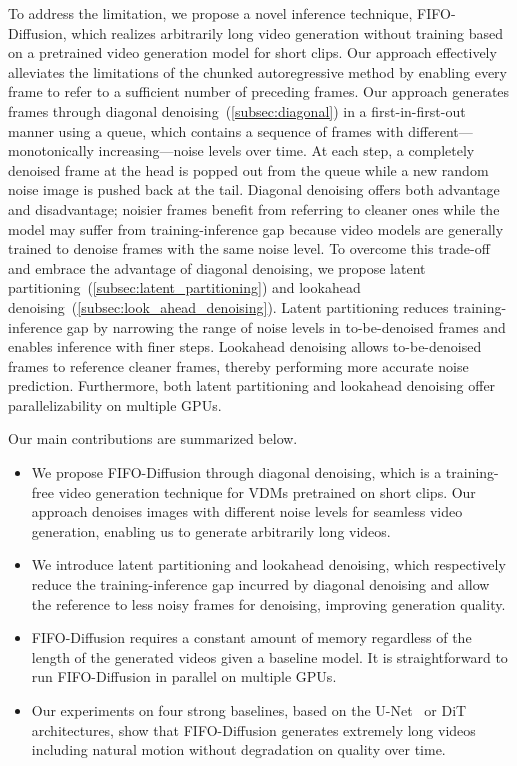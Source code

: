 To address the limitation, we propose a novel inference technique, FIFO-Diffusion, which realizes arbitrarily long video generation without training based on a pretrained video generation model for short clips.
Our approach effectively alleviates the limitations of the chunked autoregressive method by enabling every frame to refer to a sufficient number of preceding frames. 
Our approach generates frames through diagonal denoising~(\cref{subsec:diagonal}) in a first-in-first-out manner using a queue, which contains a sequence of frames with different---monotonically increasing---noise levels over time.
At each step, a completely denoised frame at the head is popped out from the queue while a new random noise image is pushed back at the tail.
Diagonal denoising offers both advantage and disadvantage; noisier frames benefit from referring to cleaner ones while the model may suffer from training-inference gap because video models are generally trained to denoise frames with the same noise level.
To overcome this trade-off and embrace the advantage of diagonal denoising, we propose latent partitioning~(\cref{subsec:latent_partitioning}) and lookahead denoising~(\cref{subsec:look_ahead_denoising}). 
Latent partitioning reduces training-inference gap by narrowing the range of noise levels in to-be-denoised frames and enables inference with finer steps.
Lookahead denoising allows to-be-denoised frames to reference cleaner frames, thereby performing more accurate noise prediction.
Furthermore, both latent partitioning and lookahead denoising offer parallelizability on multiple GPUs.


\vspace{2mm}
Our main contributions are summarized below.
\begin{itemize}
    \item We propose FIFO-Diffusion through diagonal denoising, which is a training-free video generation technique for VDMs pretrained on short clips.
    Our approach denoises images with different noise levels for seamless video generation, enabling us to generate arbitrarily long videos.
    \item We introduce latent partitioning and lookahead denoising, which respectively reduce the training-inference gap incurred by diagonal denoising and allow the reference to less noisy frames for denoising, improving generation quality.
    \item FIFO-Diffusion requires a constant amount of memory regardless of the length of the generated videos given a baseline model. It is straightforward to run FIFO-Diffusion in parallel on multiple GPUs.
    \item Our experiments on four strong baselines, based on the U-Net~\citep{ronneberger2015unet} or DiT~\citep{peebles2023dit} architectures, show that FIFO-Diffusion generates extremely long videos including natural motion without degradation on quality over time.
\end{itemize}